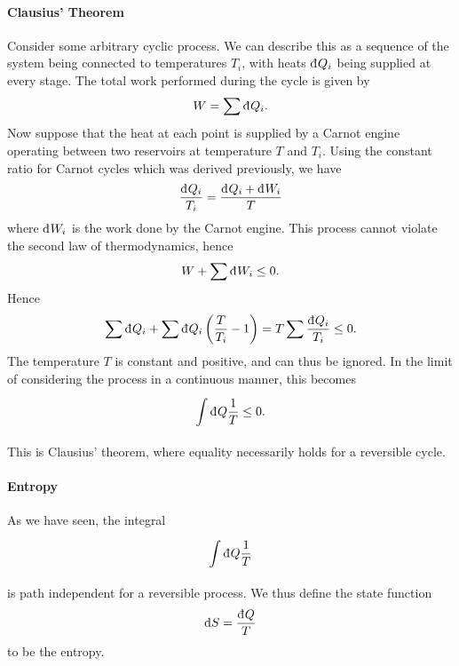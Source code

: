 \paragraph{Clausius' Theorem}
Consider some arbitrary cyclic process. We can describe this as a sequence of the system being connected to temperatures $T_{i}$, with heats $\din{Q_{i}}$ being supplied at every stage. The total work performed during the cycle is given by
\begin{align*}
	W = \sum\din{Q_{i}}.
\end{align*}
Now suppose that the heat at each point is supplied by a Carnot engine operating between two reservoirs at temperature $T$ and $T_{i}$. Using the constant ratio for Carnot cycles which was derived previously, we have
\begin{align*}
	\frac{\din{Q_{i}}}{T_{i}} = \frac{\din{Q_{i}} + \din{W_{i}}}{T}
\end{align*}
where $\din{W_{i}}$ is the work done by the Carnot engine. This process cannot violate the second law of thermodynamics, hence
\begin{align*}
	W + \sum\din{W_{i}} \leq 0.
\end{align*}
Hence
\begin{align*}
	\sum\din{Q_{i}} + \sum\din{Q_{i}}\left(\frac{T}{T_{i}} - 1\right) = T\sum\frac{\din{Q_{i}}}{T_{i}} \leq 0.
\end{align*}
The temperature $T$ is constant and positive, and can thus be ignored. In the limit of considering the process in a continuous manner, this becomes
\begin{align*}
	\intin{}{}{Q}{\frac{1}{T}} \leq 0.
\end{align*}
This is Clausius' theorem, where equality necessarily holds for a reversible cycle.

\paragraph{Entropy}
As we have seen, the integral
\begin{align*}
	\intin{}{}{Q}{\frac{1}{T}}
\end{align*}
is path independent for a reversible process. We thus define the state function
\begin{align*}
	\dd{S} = \frac{\din{Q}}{T}
\end{align*}
to be the entropy.

